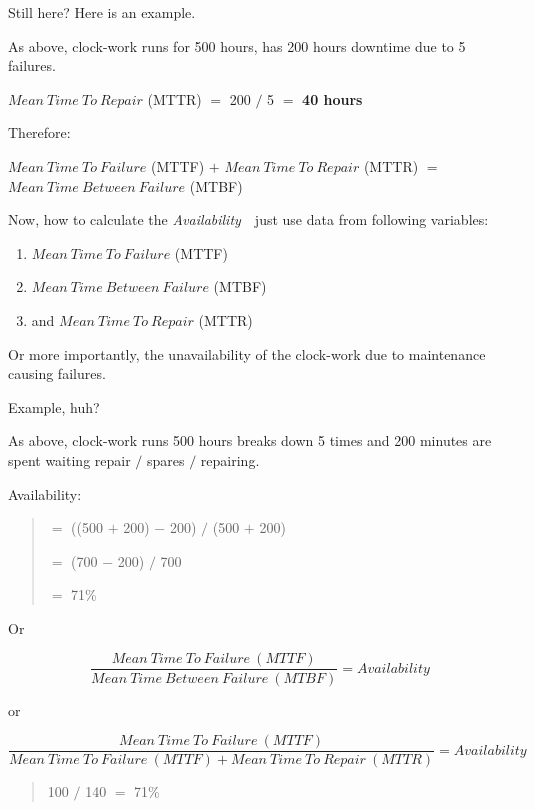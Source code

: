 Still here? Here is an example.

As above, clock-work runs for 500 hours, has 200 hours downtime due to 5 failures.

$Mean~Time~To~Repair$ (MTTR)  $=$  200  $/$  5  $=$  \textbf{40 hours}

Therefore: 

$Mean~Time~To~Failure$ (MTTF)  $+$  $Mean~Time~To~Repair$ (MTTR) $=$  $Mean~Time~Between~Failure$ (MTBF)

Now, how to calculate the \emph{Availability}~\textemdash~just use data from following variables:

\begin{enumerate}

 \item $Mean~Time~To~Failure$ (MTTF)
 \item $Mean~Time~Between~Failure$ (MTBF)
 \item and $Mean~Time~To~Repair$ (MTTR)
\end{enumerate}

Or more importantly, the unavailability of the clock-work due to maintenance causing failures.

Example, huh?

As above, clock-work runs 500 hours breaks down 5 times and 200 minutes are spent waiting repair $/$ spares $/$ repairing.

Availability:
\begin{quote}

 $=$  ((500 $+$ 200) $-$ 200) $/$ (500 $+$ 200)

 $=$  (700 $-$ 200) $/$ 700

 $=$  71\%
\end{quote}

Or

\begin{equation}\label{eq:Availability calculation}
\frac{Mean~Time~To~Failure~(MTTF)}
{Mean~Time~Between~Failure~(MTBF)} =  Availability
\end{equation}

or 


\begin{equation}\label{eq:Same Availability calculation}
\frac{Mean~Time~To~Failure~(MTTF)}
{Mean~Time~To~Failure~(MTTF)  +  Mean~Time~To~Repair~(MTTR)}  =  Availability
\end{equation}

\begin{quote}
100 $/$ 140  $=$  71\% 
\end{quote}

